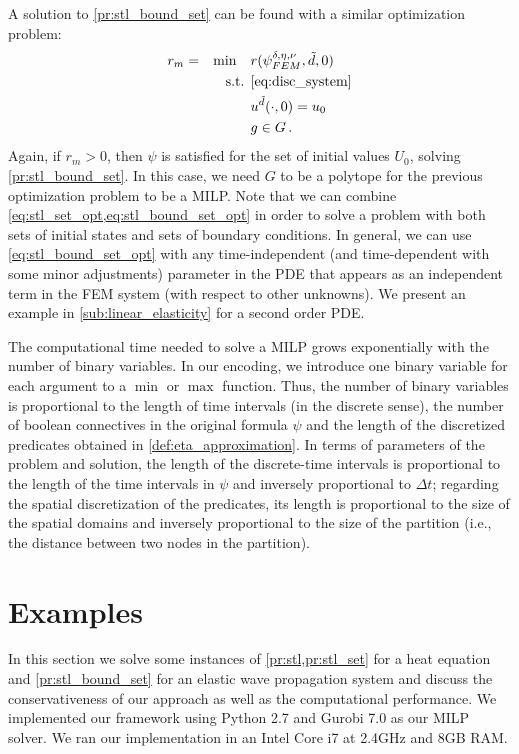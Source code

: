 \documentclass[letterpaper, 10 pt, conference]{ieeeconf/ieeeconf}
\begin{document}
A solution to \cref{pr:stl_bound_set} can be found with a similar optimization
problem:
%
\begin{equation}
    \label{eq:stl_bound_set_opt}
    \begin{aligned}
        &r_m = &\min \quad &r(\psi^{\delta, \eta, \nu}_{FEM}, \tilde{d}, 0) \\
        &  &\text{s.t. } &\cref{eq:disc_system} \\
        &  & &u^{\tilde{d}}(\cdot, 0) = u_0 \\
        &  & &g \in G \,.
    \end{aligned}
\end{equation}
%
Again, if $r_m > 0$, then $\psi$ is satisfied for the set of initial values
$U_0$, solving \cref{pr:stl_bound_set}. In this case, we need $G$ to be 
a polytope for the previous optimization problem
to be a MILP. Note that we can combine \cref{eq:stl_set_opt,eq:stl_bound_set_opt} in order to
solve a problem with both sets of initial states and sets of boundary
conditions. In general, we can use \cref{eq:stl_bound_set_opt} with any time-independent 
(and time-dependent with some minor adjustments)
parameter in the PDE that appears
as an independent term in the FEM system (with respect to other unknowns). We
present an example in \cref{sub:linear_elasticity} for a second order PDE.

The computational time needed to solve a MILP grows exponentially with 
the number of binary variables. In our encoding, we introduce one
binary variable for each argument to a $\min$ or $\max$ function. Thus, the
number of binary variables is proportional to the length of time intervals (in
the discrete sense), the number of boolean connectives in the original formula
$\psi$ and the length of the discretized predicates obtained in
\cref{def:eta_approximation}. In terms of parameters of the problem and solution,
the length of the discrete-time intervals is proportional to the length of the time
intervals in $\psi$ and inversely proportional to $\Delta t$; regarding the
spatial discretization of the predicates, its length is proportional to the size
of the spatial domains and inversely proportional to the size of the partition
(i.e., the distance between two nodes in the partition).

\section{Examples}
\label{sec:examples}

In this section we solve some instances of \cref{pr:stl,pr:stl_set} for a heat
equation and \cref{pr:stl_bound_set} for an elastic wave propagation system and discuss
the conservativeness of our approach as well as the computational performance.
We implemented our framework using Python 2.7 and Gurobi 7.0 as our MILP solver.
We ran our implementation in an Intel Core i7 at 2.4GHz and 8GB RAM.
\end{document}
